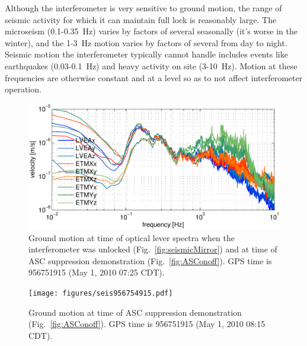 Although the interferometer is very sensitive to ground motion, the
range of seismic activity for which it can maintain full lock is
reasonably large. The microseism (0.1-0.35~Hz) varies by factors of
several seasonally (it's worse in the winter), and the 1-3~Hz motion
varies by factors of several from day to night. Seismic motion the
interferometer typically cannot handle includes events like
earthquakes (0.03-0.1~Hz) and heavy activity on site (3-10~Hz). Motion
at these frequencies are otherwise constant and at a level so as to
not affect interferometer operation. 

\begin{figure}
\begin{centering}
\includegraphics[width=1.0\textwidth]{figures/seis956751915_nolock.pdf}
\caption[]{Ground motion at time of optical lever spectra when the
  interferometer was unlocked (Fig.~\ref{fig:seismicMirror}) and at
  time of ASC suppression demonstration (Fig.~\ref{fig:ASConoff}). GPS
  time is 956751915 (May 1, 2010 07:25 CDT).}
\label{fig:seismic_nolock}
\end{centering}
\end{figure}

\begin{figure}
\begin{centering}
\texttt{[image: figures/seis956754915.pdf]}
\caption[]{Ground motion at time of ASC suppression demonstration
  (Fig.~\ref{fig:ASConoff}). GPS time is 956751915 (May 1, 2010 08:15
  CDT).}
\label{fig:seismic_locked}
\end{centering}
\end{figure}

